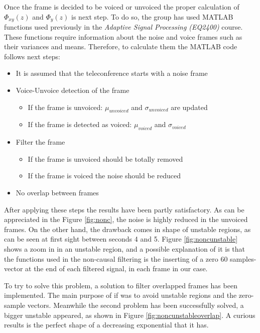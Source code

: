 \documentclass[11pt,a4paper,english]{book}  %
\theoremstyle{definition}  %
\theoremstyle{plain}  %
\theoremstyle{remark}  %
\begin{document}
		
		Once the frame is decided to be voiced or unvoiced the proper calculation of $\Phi_{xy}(z)$ and $\Phi_{y}(z)$ is next step. To do so, the group has used MATLAB functions used previously in the \textit{Adaptive Signal Processing (EQ2400)} course. These functions require information about the noise and voice frames such as their variances and means. Therefore, to calculate them the MATLAB code follows next steps:
		
		\begin{itemize}
		\item It is assumed that the teleconference starts with a noise frame
			\item Voice-Unvoice detection of the frame
		\begin{itemize}
			\item If the frame is unvoiced: $\mu_{unvoiced}$ and $\sigma_{unvoiced}$ are updated
			\item If the frame is detected as voiced: $\mu_{voiced}$ and $\sigma_{voiced}$
			\end{itemize}
			
		\item Filter the frame
			\begin{itemize}
			\item If the frame is unvoiced should be totally removed
			\item If the frame is voiced the noise should be reduced
			\end{itemize}
			\item No overlap between frames
		\end{itemize}
		
		After applying these steps the results have been partly satisfactory. As can be appreciated in the Figure \ref{fig:nonc}, the noise is highly reduced in the unvoiced frames. On the other hand, the drawback comes in shape of unstable regions, as can be seen at first sight between seconds 4 and 5. Figure \ref{fig:noncunstable} shows a zoom in in an unstable region, and a possible explanation of it is that the functions used in the non-causal filtering is the inserting of a zero 60 samples-vector at the end of each filtered signal, in each frame in our case.
		
		To try to solve this problem, a solution to filter overlapped frames has been implemented. The main purpose of if was to avoid unstable regions and the zero-sample vectors. Meanwhile the second problem has been successfully solved, a bigger unstable appeared, as shown in Figure \ref{fig:noncunstableoverlap}. A curious results is the perfect shape of a decreasing exponential that it has.
		
\end{document}
